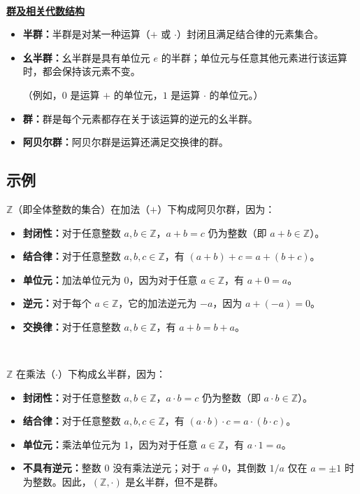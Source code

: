 \begin{tcolorbox}[title={\textbf{\tboxdef{\ref*{subsec:group-def}} 群}}]
$ $

\noindent \textbf{\underline{群及相关代数结构}}
\begin{itemize}
\item \textbf{半群：}半群是对某一种运算（$+$ 或 $\cdot$）封闭且满足结合律的元素集合。
\item \textbf{幺半群：}幺半群是具有单位元 $e$ 的半群；单位元与任意其他元素进行该运算时，都会保持该元素不变。

（例如，$0$ 是运算 $+$ 的单位元，$1$ 是运算 $\cdot$ 的单位元。）
\item \textbf{群：}群是每个元素都存在关于该运算的逆元的幺半群。
\item \textbf{阿贝尔群：}阿贝尔群是运算还满足交换律的群。
\end{itemize}
\end{tcolorbox}

\subsection{示例}
\label{subsec:group-ex}

$\mathbb{Z}$（即全体整数的集合）在加法（$+$）下构成阿贝尔群，因为：
\begin{itemize}
\item \textbf{封闭性：}对于任意整数 $a, b \in \mathbb{Z}$，$a + b = c$ 仍为整数（即 $a+b \in \mathbb{Z}$）。
\item \textbf{结合律：}对于任意整数 $a, b, c \in \mathbb{Z}$，有 $(a + b) + c = a + (b + c)$。
\item \textbf{单位元：}加法单位元为 0，因为对于任意 $a \in \mathbb{Z}$，有 $a + 0 = a$。
\item \textbf{逆元：}对于每个 $a \in \mathbb{Z}$，它的加法逆元为 $-a$，因为 $a + (-a) = 0$。
\item \textbf{交换律：}对于任意整数 $a, b \in \mathbb{Z}$，有 $a + b = b + a$。
\end{itemize}

$ $

\noindent $\mathbb{Z}$ 在乘法（$\cdot$）下构成幺半群，因为：
\begin{itemize}
\item \textbf{封闭性：}对于任意整数 $a, b \in \mathbb{Z}$，$a \cdot b = c$ 仍为整数（即 $a\cdot b \in \mathbb{Z}$）。
\item \textbf{结合律：}对于任意整数 $a, b, c \in \mathbb{Z}$，有 $(a \cdot b) \cdot c = a \cdot (b \cdot c)$。
\item \textbf{单位元：}乘法单位元为 1，因为对于任意 $a \in \mathbb{Z}$，有 $a \cdot 1 = a$。
\item \textbf{不具有逆元：}整数 $0$ 没有乘法逆元；对于 $a\ne0$，其倒数 $1/a$ 仅在 $a=\pm1$ 时为整数。因此，$(\mathbb{Z},\cdot)$ 是幺半群，但不是群。
\end{itemize}
$ $

